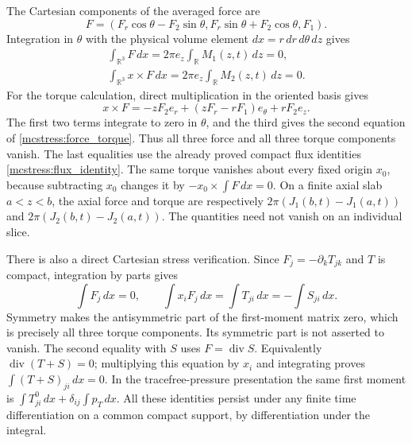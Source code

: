 The Cartesian components of the averaged force are
\[
 F=(F_r\cos\theta-F_2\sin\theta,
       F_r\sin\theta+F_2\cos\theta,F_1).
\]
Integration in $\theta$ with the physical volume element
$dx=r\,dr\,d\theta\,dz$ gives
\begin{equation}\label{mcstress:force_torque}
\begin{gathered}
 \int_{\mathbb R^3}F\,dx
  =2\pi e_z\int_{\mathbb R}M_1(z,t)\,dz=0,\\
 \int_{\mathbb R^3}x\times F\,dx
  =2\pi e_z\int_{\mathbb R}M_2(z,t)\,dz=0.
\end{gathered}
\end{equation}
For the torque calculation, direct multiplication in the oriented
basis gives
\[
 x\times F=-zF_2e_r+(zF_r-rF_1)e_\theta+rF_2e_z.
\]
The first two terms integrate to zero in $\theta$, and the third
gives the second equation of \eqref{mcstress:force_torque}.
Thus all three force and all three torque components vanish. The last
equalities use the already proved compact flux identities
\eqref{mcstress:flux_identity}. The same torque vanishes about every
fixed origin $x_0$, because subtracting $x_0$ changes it by
$-x_0\times\int F\,dx=0$. On a finite axial slab $a<z<b$, the
axial force and torque are respectively
$2\pi(J_1(b,t)-J_1(a,t))$ and
$2\pi(J_2(b,t)-J_2(a,t))$. The quantities need not vanish on an
individual slice.

There is also a direct Cartesian stress verification. Since
$F_j=-\partial_kT_{jk}$ and $T$ is compact, integration by parts gives
\begin{equation}\label{mcstress:first_moments}
 \int F_j\,dx=0,\qquad
 \int x_iF_j\,dx=\int T_{ji}\,dx=-\int S_{ji}\,dx.
\end{equation}
Symmetry makes the antisymmetric part of the first-moment matrix zero,
which is precisely all three torque components. Its symmetric part
is not asserted to vanish. The second equality with $S$ uses
$F=\operatorname{div}S$. Equivalently
$\operatorname{div}(T+S)=0$; multiplying this equation by $x_i$ and
integrating proves $\int(T+S)_{ji}\,dx=0$. In the tracefree-pressure
presentation the same first moment is
$\int T^0_{ji}\,dx+\delta_{ij}\int p_T\,dx$.
All these identities persist under any finite time differentiation on
a common compact support, by differentiation under the integral.

